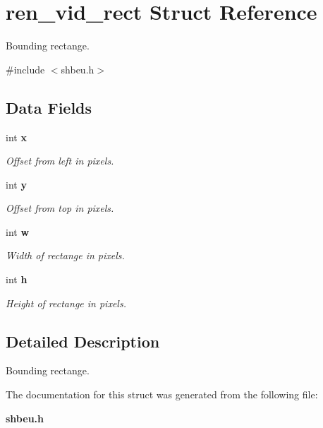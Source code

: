 \section{ren\_\-vid\_\-rect Struct Reference}
\label{structren__vid__rect}


Bounding rectange.  




{\ttfamily \#include $<$shbeu.h$>$}

\subsection*{Data Fields}
\begin{DoxyCompactItemize}
\item 
int {\bf x}\label{structren__vid__rect_a2297868cbfa38ebf831d1ed6055e3ab2}

\begin{DoxyCompactList}\small\item\em Offset from left in pixels. \item\end{DoxyCompactList}\item 
int {\bf y}\label{structren__vid__rect_a39f8dc3bf01894c52dccc9e7b894c465}

\begin{DoxyCompactList}\small\item\em Offset from top in pixels. \item\end{DoxyCompactList}\item 
int {\bf w}\label{structren__vid__rect_a6febc93df4f74bbd707d71c5ea9c6c1e}

\begin{DoxyCompactList}\small\item\em Width of rectange in pixels. \item\end{DoxyCompactList}\item 
int {\bf h}\label{structren__vid__rect_ad26ca0b9f79e460612ec11eadd156f38}

\begin{DoxyCompactList}\small\item\em Height of rectange in pixels. \item\end{DoxyCompactList}\end{DoxyCompactItemize}


\subsection{Detailed Description}
Bounding rectange. 

The documentation for this struct was generated from the following file:\begin{DoxyCompactItemize}
\item 
{\bf shbeu.h}\end{DoxyCompactItemize}
